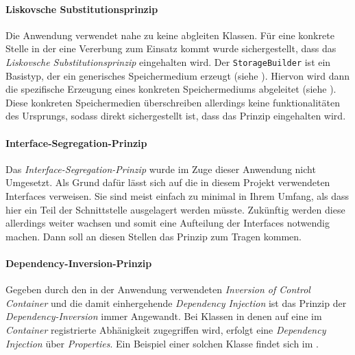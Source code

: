 \paragraph{Liskovsche Substitutionsprinzip}

Die Anwendung verwendet nahe zu keine abgleiten Klassen.
Für eine konkrete Stelle in der eine Vererbung zum Einsatz kommt wurde sichergestellt, dass das \emph{Liskovsche Substitutionsprinzip} eingehalten wird.
Der \texttt{StorageBuilder} ist ein Basistyp, der ein generisches Speichermedium erzeugt (siehe ).
Hiervon wird dann die spezifische Erzeugung eines konkreten Speichermediums abgeleitet (siehe ).
Diese konkreten Speichermedien überschreiben allerdings keine funktionalitäten des Ursprungs, sodass direkt sichergestellt ist, dass das Prinzip eingehalten wird.

\bgroup

    \label{lst:storage_builder}
\egroup

\bgroup

    \label{lst:volume_builder}
\egroup

\newpage

\paragraph{Interface-Segregation-Prinzip}

Das \emph{Interface-Segregation-Prinzip} wurde im Zuge dieser Anwendung nicht Umgesetzt.
Als Grund dafür lässt sich auf die in diesem Projekt verwendeten Interfaces verweisen.
Sie sind meist einfach zu minimal in Ihrem Umfang, als dass hier ein Teil der Schnittstelle ausgelagert werden müsste.
Zukünftig werden diese allerdings weiter wachsen und somit eine Aufteilung der Interfaces notwendig machen.
Dann soll an diesen Stellen das Prinzip zum Tragen kommen.

\paragraph{Dependency-Inversion-Prinzip}

Gegeben durch den in der Anwendung verwendeten \emph{Inversion of Control Container} und die damit einhergehende \emph{Dependency Injection} ist das Prinzip der \emph{Dependency-Inversion} immer Angewandt.
Bei Klassen in denen auf eine im \emph{Container} registrierte Abhänigkeit zugegriffen wird, erfolgt eine \emph{Dependency Injection} über \emph{Properties}.
Ein Beispiel einer solchen Klasse findet sich im .


